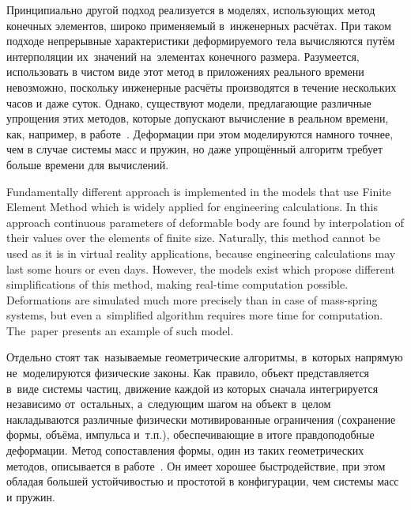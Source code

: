 \documentclass[a4paper, 12pt, titlepage]{extarticle}
\begin{document}
\begin{original}
    Принципиально другой подход реализуется в моделях, использующих метод конечных элементов, широко
    применяемый в~инженерных расчётах. При таком подходе
    непрерывные характеристики деформируемого тела вычисляются путём интерполяции их~значений
    на~элементах конечного размера. Разумеется, использовать в чистом виде этот метод
    в приложениях реального времени невозможно, поскольку инженерные расчёты производятся в
    течение нескольких часов и даже суток. Однако, существуют модели, предлагающие различные упрощения этих
    методов, которые допускают вычисление в реальном времени, как, например, в работе~\cite{mueller-stable}.
    Деформации при этом моделируются намного точнее, чем в случае системы масс и пружин, но даже
    упрощённый алгоритм требует больше времени для вычислений. %
\end{original}

    Fundamentally different approach is implemented in the models that use Finite Element Method
    which is widely applied for engineering calculations. In this approach continuous parameters of
    deformable body are found by interpolation of their values over the elements of finite size.
    Naturally, this method cannot be used as it is in virtual reality applications, because
    engineering calculations may last some hours or even days. However, the models exist which
    propose different simplifications of this method, making real-time computation possible.
    Deformations are simulated much more precisely than in case of mass-spring systems, but even
    a~simplified algorithm requires more time for computation. The~paper \cite{mueller-stable}
    presents an example of such model.

\begin{original}
    Отдельно стоят так~называемые геометрические алгоритмы, в~которых напрямую не~моделируются
    физические законы. Как~правило, объект представляется в~виде системы частиц, движение каждой из
    которых сначала интегрируется независимо от~остальных, а~следующим шагом на объект в~целом
    накладываются различные физически мотивированные ограничения (сохранение формы, объёма, импульса
    и~т.п.), обеспечивающие в итоге правдоподобные деформации. Метод сопоставления формы, один из
    таких геометрических методов, описывается в работе~\cite{mueller-meshless}. Он имеет хорошее быстродействие,
    при этом обладая большей устойчивостью и простотой в конфигурации, чем системы масс и пружин.
\end{original}
\end{document}
